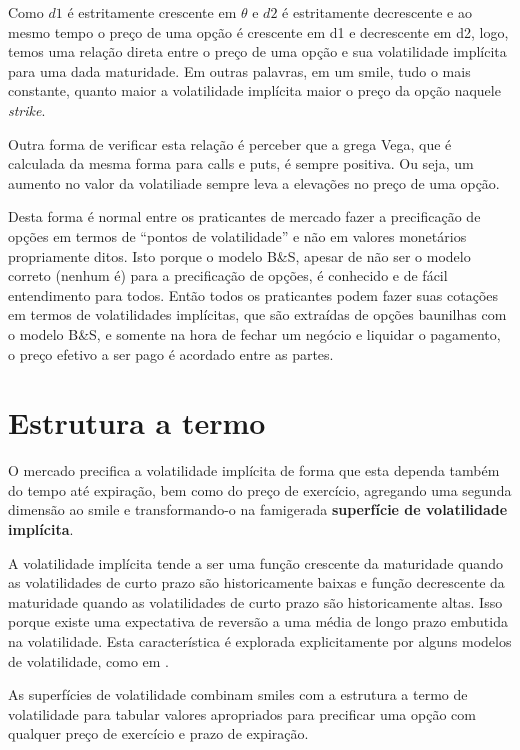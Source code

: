 \documentclass[]{book}
\begin{document}
Como \(d1\) é estritamente crescente em \(\theta\) e \(d2\) é
estritamente decrescente e ao mesmo tempo o preço de uma opção é
crescente em d1 e decrescente em d2, logo, temos uma relação direta
entre o preço de uma opção e sua volatilidade implícita para uma dada
maturidade. Em outras palavras, em um smile, tudo o mais constante,
quanto maior a volatilidade implícita maior o preço da opção naquele
\emph{strike}.

Outra forma de verificar esta relação é perceber que a grega Vega, que é
calculada da mesma forma para calls e puts, é sempre positiva. Ou seja,
um aumento no valor da volatiliade sempre leva a elevações no preço de
uma opção.

Desta forma é normal entre os praticantes de mercado fazer a
precificação de opções em termos de ``pontos de volatilidade'' e não em
valores monetários propriamente ditos. Isto porque o modelo B\&S, apesar
de não ser o modelo correto (nenhum é) para a precificação de opções, é
conhecido e de fácil entendimento para todos. Então todos os praticantes
podem fazer suas cotações em termos de volatilidades implícitas, que são
extraídas de opções baunilhas com o modelo B\&S, e somente na hora de
fechar um negócio e liquidar o pagamento, o preço efetivo a ser pago é
acordado entre as partes.

\section{Estrutura a termo}\label{estrutura-a-termo}

O mercado precifica a volatilidade implícita de forma que esta dependa
também do tempo até expiração, bem como do preço de exercício, agregando
uma segunda dimensão ao smile e transformando-o na famigerada
\textbf{superfície de volatilidade implícita}.

A volatilidade implícita tende a ser uma função crescente da maturidade
quando as volatilidades de curto prazo são historicamente baixas e
função decrescente da maturidade quando as volatilidades de curto prazo
são historicamente altas. Isso porque existe uma expectativa de reversão
a uma média de longo prazo embutida na volatilidade. Esta característica
é explorada explicitamente por alguns modelos de volatilidade, como em
\citet{Heston1993}.

As superfícies de volatilidade combinam smiles com a estrutura a termo
de volatilidade para tabular valores apropriados para precificar uma
opção com qualquer preço de exercício e prazo de expiração.
\end{document}
